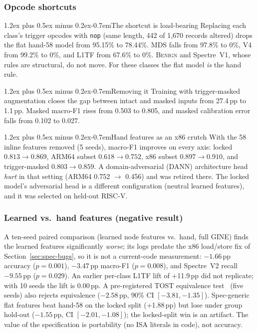 \documentclass[conference]{IEEEtran}
\makeatletter
\renewcommand\paragraph{\@startsection{paragraph}{4}{\z@}%
  {1.2ex plus 0.5ex minus 0.2ex}{-0.7em}{\normalfont\normalsize\bfseries}}
\newcommand{\cls}[1]{\textsc{#1}}
\makeatother
\begin{document}
\subsubsection{Opcode shortcuts}
\label{sec:shortcut}
\paragraph{The shortcut is load-bearing}
Replacing each class's trigger opcodes with \texttt{nop} (same length, 442 of
1,670 records altered) drops the flat hand-58 model from 95.15\% to 78.44\%.
MDS falls from 97.8\% to 0\%, V4 from 99.2\% to 0\%, and L1TF from 67.6\% to
0\%. \cls{Benign} and Spectre~V1, whose rules are structural, do not move.
For these classes the flat model \emph{is} the hand rule.

\paragraph{Removing it}
Training with trigger-masked augmentation closes the gap between intact and
masked inputs from 27.4\,pp to 1.1\,pp. Masked macro-F1 rises from 0.503 to
0.805, and masked calibration error falls from 0.102 to 0.027.

\paragraph{Hand features as an x86 crutch}
With the 58 inline features removed (5 seeds), macro-F1 improves on every
axis: locked $0.813\to0.869$, ARM64 subset $0.618\to0.752$, x86 subset
$0.897\to0.910$, and trigger-masked $0.803\to0.859$.
A domain-adversarial (DANN) architecture head \emph{hurt} in that setting
(ARM64 0.752 $\to$ 0.456) and was retired there. The locked model's
adversarial head is a different configuration (neutral learned features), and
it was selected on held-out RISC-V.

\subsubsection{Learned vs.\ hand features (negative result)}
\label{sec:learned}
A ten-seed paired comparison (learned node features vs.\
hand, full GINE) finds the learned features significantly \emph{worse}; its
logs predate the x86 load/store fix of Section~\ref{sec:spec-bugs}, so it is
not a current-code measurement:
$-1.66$\,pp accuracy ($p=0.001$), $-3.47$\,pp macro-F1 ($p=0.008$), and
Spectre~V2 recall $-9.55$\,pp ($p=0.029$). An earlier per-class L1TF lift of
+11.9\,pp did not replicate; with 10 seeds the lift is 0.00\,pp. A
pre-registered TOST equivalence test~\cite{schuirmann1987} (five seeds) also rejects
equivalence ($-2.58$\,pp, 90\% CI $[-3.81,-1.35]$). Spec-generic flat features
beat hand-58 on the locked split (+1.88\,pp) but lose under group hold-out
($-1.55$\,pp, CI $[-2.01,-1.08]$); the locked-split win is an artifact. The
value of the specification is portability (no ISA literals in code), not
accuracy.
\end{document}
